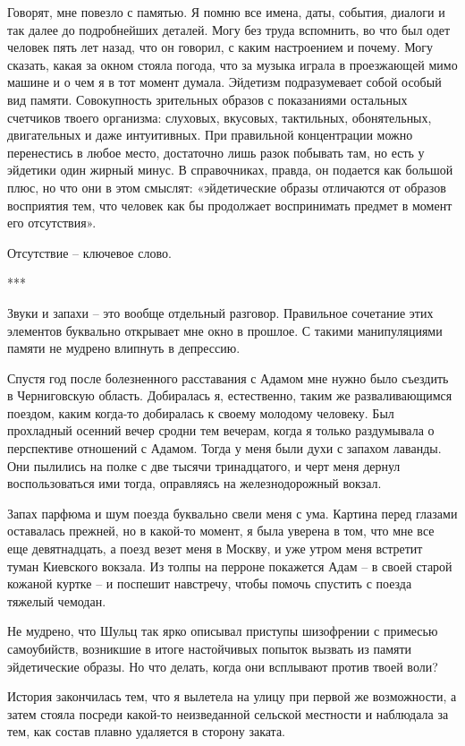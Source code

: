 \documentclass[
]{book}
\begin{document}
Говорят, мне повезло с памятью. Я помню все имена, даты, события, диалоги и так далее до подробнейших деталей. Могу без труда вспомнить, во что был одет человек пять лет назад, что он говорил, с каким настроением и почему. Могу сказать, какая за окном стояла погода, что за музыка играла в проезжающей мимо машине и о чем я в тот момент думала. Эйдетизм подразумевает собой особый вид памяти. Совокупность зрительных образов с показаниями остальных счетчиков твоего организма: слуховых, вкусовых, тактильных, обонятельных, двигательных и даже интуитивных. При правильной концентрации можно перенестись в любое место, достаточно лишь разок побывать там, но есть у эйдетики один жирный минус. В справочниках, правда, он подается как большой плюс, но что они в этом смыслят: «эйдетические образы отличаются от образов восприятия тем, что человек как бы продолжает воспринимать предмет в момент его отсутствия».

Отсутствие -- ключевое слово.

***

Звуки и запахи -- это вообще отдельный разговор. Правильное сочетание этих элементов буквально открывает мне окно в прошлое. С такими манипуляциями памяти не мудрено влипнуть в депрессию.

Спустя год после болезненного расставания с Адамом мне нужно было съездить в Черниговскую область. Добиралась я, естественно, таким же разваливающимся поездом, каким когда-то добиралась к своему молодому человеку. Был прохладный осенний вечер сродни тем вечерам, когда я только раздумывала о перспективе отношений с Адамом. Тогда у меня были духи с запахом лаванды. Они пылились на полке с две тысячи тринадцатого, и черт меня дернул воспользоваться ими тогда, оправляясь на железнодорожный вокзал.

Запах парфюма и шум поезда буквально свели меня с ума. Картина перед глазами оставалась прежней, но в какой-то момент, я была уверена в том, что мне все еще девятнадцать, а поезд везет меня в Москву, и уже утром меня встретит туман Киевского вокзала. Из толпы на перроне покажется Адам -- в своей старой кожаной куртке -- и поспешит навстречу, чтобы помочь спустить с поезда тяжелый чемодан.

Не мудрено, что Шульц так ярко описывал приступы шизофрении с примесью самоубийств, возникшие в итоге настойчивых попыток вызвать из памяти эйдетические образы. Но что делать, когда они всплывают против твоей воли?

История закончилась тем, что я вылетела на улицу при первой же возможности, а затем стояла посреди какой-то неизведанной сельской местности и наблюдала за тем, как состав плавно удаляется в сторону заката.
\end{document}
